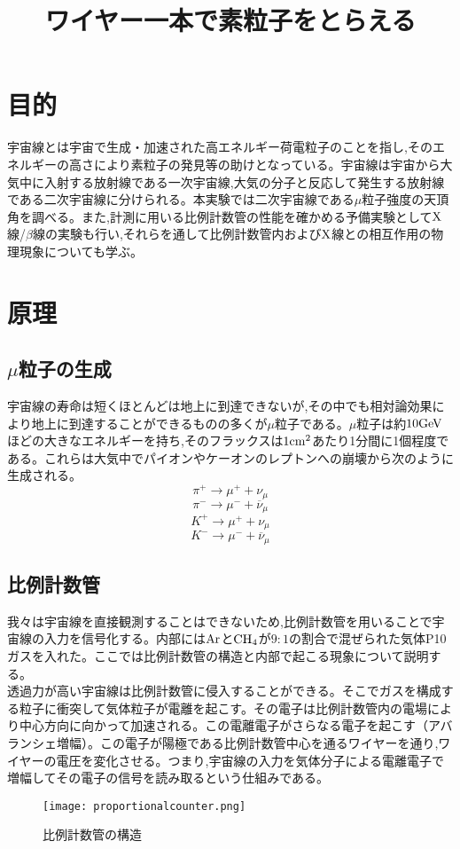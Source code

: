 \documentclass[a4j]{jsarticle}
\title{ワイヤー一本で素粒子をとらえる}
\date{}
\begin{document}
\maketitle 

\section{目的}
宇宙線とは宇宙で生成・加速された高エネルギー荷電粒子のことを指し,そのエネルギーの高さにより素粒子の発見等の助けとなっている。宇宙線は宇宙から大気中に入射する放射線である一次宇宙線,大気の分子と反応して発生する放射線である二次宇宙線に分けられる。本実験では二次宇宙線である$\mu$粒子強度の天頂角を調べる。また,計測に用いる比例計数管の性能を確かめる予備実験として$\rm{X}$線/$\beta$線の実験も行い,それらを通して比例計数管内および$\rm{X}$線との相互作用の物理現象についても学ぶ。

\section{原理}
	\subsection{$\mu$粒子の生成}
	宇宙線の寿命は短くほとんどは地上に到達できないが,その中でも相対論効果により地上に到達することができるものの多くが$\mu$粒子である。$\mu$粒子は約$10\rm{GeV}$ほどの大きなエネルギーを持ち,そのフラックスは$1\rm{cm}^2$あたり1分間に1個程度である。これらは大気中でパイオンやケーオンのレプトンへの崩壊から次のように生成される。
	\[
	\pi^{+} \to \mu^{+} + \nu_{\mu}
	\]
	\[
	\pi^{-} \to \mu^{-} + \overline{\nu}_{\mu}
	\]
	\[
	K^{+} \to \mu^{+} + \nu_{\mu}
	\]
	\[
	K^{-} \to \mu^{-} + \overline{\nu}_{\mu}
	\]
	

	\subsection{比例計数管}
	我々は宇宙線を直接観測することはできないため,比例計数管を用いることで宇宙線の入力を信号化する。内部には$\rm{Ar}$と$\rm{CH_4}$が$9:1$の割合で混ぜられた気体P10ガスを入れた。ここでは比例計数管の構造と内部で起こる現象について説明する。\\
	\quad 透過力が高い宇宙線は比例計数管に侵入することができる。そこでガスを構成する粒子に衝突して気体粒子が電離を起こす。その電子は比例計数管内の電場により中心方向に向かって加速される。この電離電子がさらなる電子を起こす（アバランシェ増幅）。この電子が陽極である比例計数管中心を通るワイヤーを通り,ワイヤーの電圧を変化させる。つまり,宇宙線の入力を気体分子による電離電子で増幅してその電子の信号を読み取るという仕組みである。
	\begin{figure}[htbp]
	\centering
	\texttt{[image: proportionalcounter.png]}
	\caption{比例計数管の構造}
	\end{figure}
	
\end{document}
